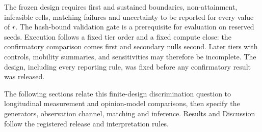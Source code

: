 The frozen design requires first and sustained boundaries, non-attainment, infeasible cells, matching failures and uncertainty to be reported for every value of $r$. The hash-bound validation gate is a prerequisite for evaluation on reserved seeds. Execution follows a fixed tier order and a fixed compute close: the confirmatory comparison comes first and secondary nulls second. Later tiers with controls, mobility summaries, and sensitivities may therefore be incomplete. The design, including every reporting rule, was fixed before any confirmatory result was released.

The following sections relate this finite-design discrimination question to longitudinal measurement and opinion-model comparisons, then specify the generators, observation channel, matching and inference. Results and Discussion follow the registered release and interpretation rules.

